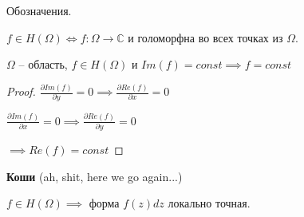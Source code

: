 \begin{remark}
    Обозначения.

    $f \in H(\Omega) \Leftrightarrow f : \Omega \rightarrow \mathbb{C}$ и голоморфна во всех точках из $\Omega$.
\end{remark}
\begin{consequence}
    $\Omega$ -- область, $f \in H(\Omega)$ и $Im(f) = const \implies f = const$
\end{consequence}
\begin{proof}
    $\frac{\partial Im (f)}{\partial y} = 0 \implies \frac{\partial Re(f)}{\partial x} = 0$

    $\frac{\partial Im (f)}{\partial x} = 0 \implies \frac{\partial Re(f)}{\partial y} = 0$

    $\implies Re(f) = const$
\end{proof}
\begin{theorem}
    \textbf{Коши} (ah, shit, here we go again...)

    $f \in H(\Omega) \implies $ форма $f(z) dz$ локально точная.
\end{theorem}
